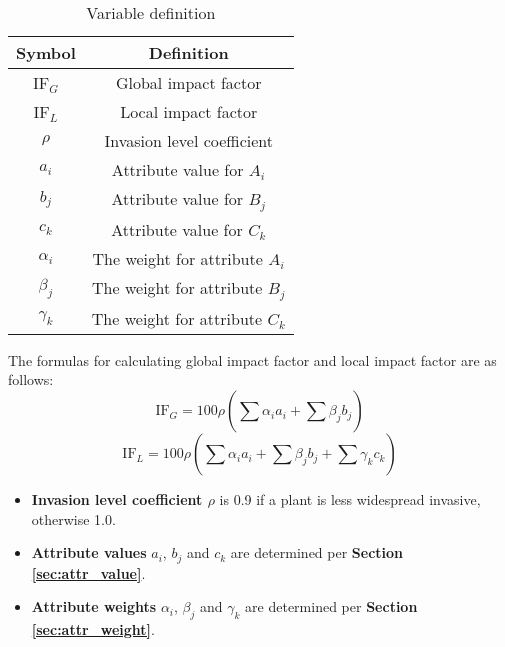 \documentclass[12pt]{article}
\begin{document}
		{
			\fontsize{10}{14}\selectfont
			{
				\begin{longtable}{cc}
					
					\caption{Variable definition}
					\label{tb:syms}\\
					\toprule
					Symbol&Definition\\
					\toprule
					IF$_G$&Global impact factor\\
					IF$_L$&Local impact factor\\
					$\rho$&Invasion level coefficient\\
					$a_i$&Attribute value for $A_i$\\
					$b_j$&Attribute value for $B_j$\\
					$c_k$&Attribute value for $C_k$\\
					$\alpha_i$&The weight for attribute $A_i$\\
					$\beta_j$&The weight for attribute $B_j$\\
					$\gamma_k$&The weight for attribute $C_k$\\
					\bottomrule
					
				\end{longtable}
			}
		}
		The formulas for calculating global impact factor and local impact factor are as follows:
		\begin{equation} \label{eq:ifg}
			\mathrm{IF}_G = 100\rho \left( \sum_{} \alpha_ia_i + \sum_{} \beta_jb_j \right)
		\end{equation} 
		\begin{equation} \label{eq:ifl}
			\mathrm{IF}_L = 100\rho \left( \sum_{} \alpha_ia_i + \sum_{} \beta_jb_j + \sum_{} \gamma_kc_k \right)
		\end{equation}
		
		{
		
		\begin{itemize}
		\vspace{-0.2cm}
		\item \textbf{Invasion level coefficient $\rho$} is 0.9 if a plant is less widespread invasive, otherwise 1.0.
		\vspace{-0.2cm}
		\item \textbf{Attribute values} $a_i$, $b_j$ and $c_k$ are determined per \textbf{Section \ref{sec:attr_value}}.
		\vspace{-0.2cm}
		\item \textbf{Attribute weights} $\alpha_i$, $\beta_j$ and $\gamma_k$ are determined per \textbf{Section \ref{sec:attr_weight}}.
		\end{itemize}
		}
	
\end{document}
